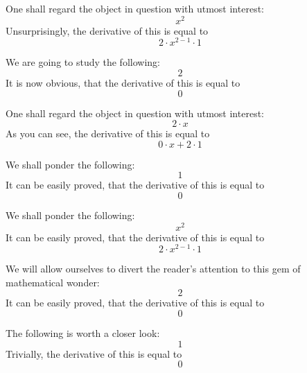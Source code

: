 \documentclass{article}
\begin{document}
One shall regard the object in question with utmost interest:
\begin{equation}
x ^{2 } 
\end{equation}
Unsurprisingly, the derivative of this is equal to
\begin{equation}
2 \cdot x ^{2 - 1 } \cdot 1 
\end{equation}

We are going to study the following:
\begin{equation}
2 
\end{equation}
It is now obvious, that the derivative of this is equal to
\begin{equation}
0 
\end{equation}

One shall regard the object in question with utmost interest:
\begin{equation}
2 \cdot x 
\end{equation}
As you can see, the derivative of this is equal to
\begin{equation}
0 \cdot x + 2 \cdot 1 
\end{equation}

We shall ponder the following:
\begin{equation}
1 
\end{equation}
It can be easily proved, that the derivative of this is equal to
\begin{equation}
0 
\end{equation}

We shall ponder the following:
\begin{equation}
x ^{2 } 
\end{equation}
It can be easily proved, that the derivative of this is equal to
\begin{equation}
2 \cdot x ^{2 - 1 } \cdot 1 
\end{equation}

We will allow ourselves to divert the reader's attention to this gem of mathematical wonder:
\begin{equation}
2 
\end{equation}
It can be easily proved, that the derivative of this is equal to
\begin{equation}
0 
\end{equation}

The following is worth a closer look:
\begin{equation}
1 
\end{equation}
Trivially, the derivative of this is equal to
\begin{equation}
0 
\end{equation}
\end{document}
